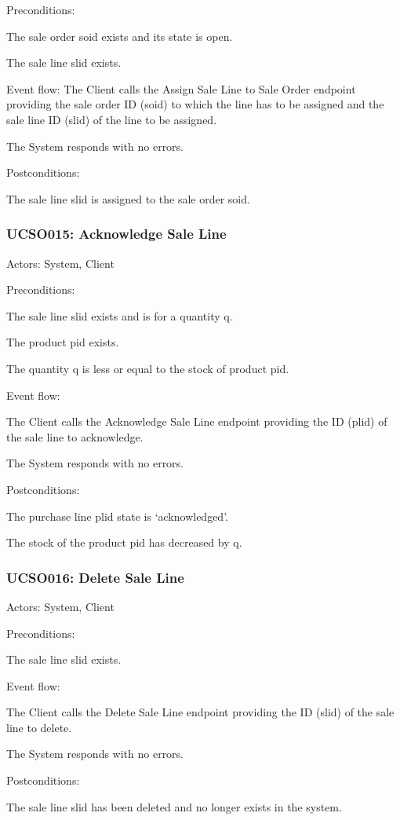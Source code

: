 Preconditions:

\ucitem The sale order soid exists and its state is open.

\ucitem The sale line slid exists.

Event flow:
\ucitem The Client calls the Assign Sale Line to Sale Order endpoint providing the sale order ID (soid) to which the line has to be assigned and the sale line ID (slid) of the 
line to be assigned.

\ucitem The System responds with no errors.

Postconditions:

\ucitem The sale line slid is assigned to the sale order soid.

\subsubsection{UCSO015: Acknowledge Sale Line}
\label{UCSO015}

Actors: System, Client

Preconditions:

\ucitem The sale line slid exists and is for a quantity q.

\ucitem The product pid exists.

\ucitem The quantity q is less or equal to the stock of product pid.

Event flow:

\ucitem The Client calls the Acknowledge Sale Line endpoint providing the ID (plid) of the sale line to acknowledge.

\ucitem The System responds with no errors.

Postconditions:

\ucitem The purchase line plid state is ‘acknowledged’.

\ucitem The stock of the product pid has decreased by q.

\subsubsection{UCSO016: Delete Sale Line}
\label{UCSO016}

Actors: System, Client

Preconditions:

\ucitem The sale line slid exists.

Event flow:

\ucitem The Client calls the Delete Sale Line endpoint providing the ID (slid) of the sale line to delete.

\ucitem The System responds with no errors.

Postconditions:

\ucitem The sale line slid has been deleted and no longer exists in the system.